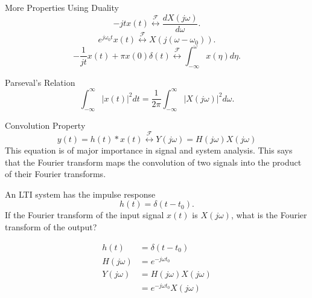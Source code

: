\begin{frame}{More Properties Using Duality}
    \begin{equation*}
        -jtx(t) \overset{\mathcal{F}}{\longleftrightarrow} \frac{dX(j\omega)}{d\omega}.
    \end{equation*}
    \begin{equation*}
        e^{j\omega_0 t}x(t) \overset{\mathcal{F}}{\longleftrightarrow} X(j(\omega - \omega_0)).
    \end{equation*}
    \begin{equation*}
        -\frac{1}{jt}x(t) + \pi x(0) \delta(t) \overset{\mathcal{F}}{\longleftrightarrow} \int_{-\infty}^{\omega}x(\eta)d\eta.
    \end{equation*}
\end{frame}

\begin{frame}{Parseval's Relation}
    \begin{equation*}
        \int_{-\infty}^{\infty} |x(t)|^2dt = \frac{1}{2\pi} \int_{-\infty}^{\infty} |X(j\omega)|^2d\omega.
    \end{equation*}

\end{frame}


\begin{frame}{Convolution Property}
    \begin{equation*}
        y(t) = h(t)\ast x(t) \overset{\mathcal{F}}{\longleftrightarrow} Y(j\omega) =  H(j\omega)  X(j\omega)
    \end{equation*}
    This equation is of major importance in signal and system analysis. This says that the Fourier transform maps the convolution of two signals into the product of their Fourier transforms.
\end{frame}


\begin{frame}[plain]
    \begin{example}
        An LTI system has the impulse response
        \begin{equation*}
            h(t) = \delta(t-t_0).
        \end{equation*}
        If the Fourier transform of the input signal $x(t)$ is $X(j\omega)$, what is the Fourier transform of the output?
    \end{example}
    \pause
    \begin{align*}
      h(t) &= \delta(t-t_0)\\
      H(j\omega) &= e^{-j\omega t_0}\\
      Y(j\omega) &=  H(j\omega)  X(j\omega)\\
      &= e^{-j\omega t_0} X(j\omega)\\
    \end{align*}
\end{frame}


